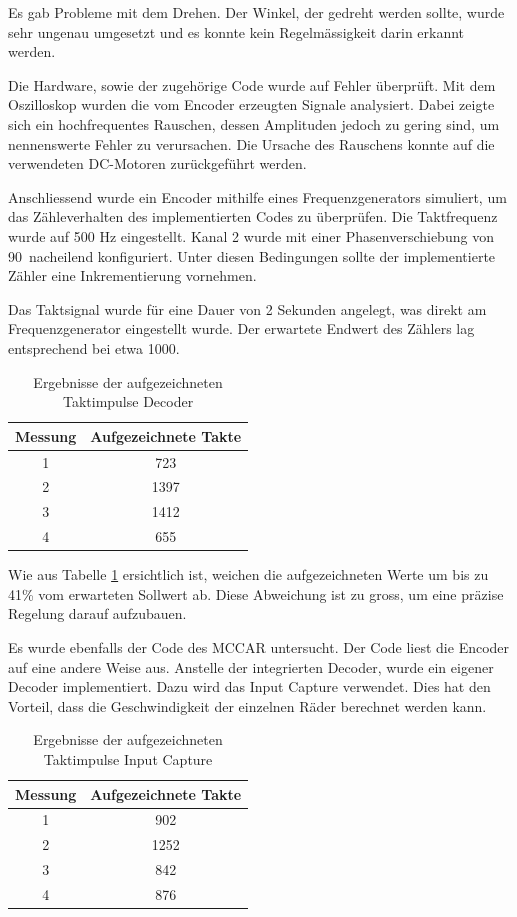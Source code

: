 Es gab Probleme mit dem Drehen. Der Winkel, der gedreht werden sollte, wurde sehr ungenau umgesetzt und es konnte kein Regelmässigkeit darin erkannt werden.

Die Hardware, sowie der zugehörige Code wurde auf Fehler überprüft. Mit dem Oszilloskop wurden die vom Encoder erzeugten Signale analysiert. Dabei zeigte sich ein hochfrequentes Rauschen, dessen Amplituden jedoch zu gering sind, um nennenswerte Fehler zu verursachen. Die Ursache des Rauschens konnte auf die verwendeten DC-Motoren zurückgeführt werden.

Anschliessend wurde ein Encoder mithilfe eines Frequenzgenerators simuliert, um das Zähleverhalten des implementierten Codes zu überprüfen. Die Taktfrequenz wurde auf 500 Hz eingestellt. Kanal 2 wurde mit einer Phasenverschiebung von 90\textdegree \ nacheilend konfiguriert. Unter diesen Bedingungen sollte der implementierte Zähler eine Inkrementierung vornehmen.

Das Taktsignal wurde für eine Dauer von 2 Sekunden angelegt, was direkt am Frequenzgenerator eingestellt wurde. Der erwartete Endwert des Zählers lag entsprechend bei etwa 1000.

\begin{table}[H]
\centering
\caption{Ergebnisse der aufgezeichneten Taktimpulse Decoder}
\label{tab:taktergebnisse_de}
\begin{tabular}{|c|c|}
\hline
\textbf{Messung} & \textbf{Aufgezeichnete Takte} \\
\hline
1 & 723 \\
2 & 1397 \\
3 & 1412 \\
4 & 655 \\
\hline
\end{tabular}
\end{table}

Wie aus Tabelle \ref{tab:taktergebnisse_de} ersichtlich ist, weichen die aufgezeichneten Werte um bis zu 41\% vom erwarteten Sollwert ab. Diese Abweichung ist zu gross, um eine präzise Regelung darauf aufzubauen.

Es wurde ebenfalls der Code des MCCAR untersucht. Der Code liest die Encoder auf eine andere Weise aus. Anstelle der integrierten Decoder, wurde ein eigener Decoder implementiert. Dazu wird das Input Capture verwendet. Dies hat den Vorteil, dass die Geschwindigkeit der einzelnen Räder berechnet werden kann.

\begin{table}[H]
\centering
\caption{Ergebnisse der aufgezeichneten Taktimpulse Input Capture}
\label{tab:taktergebnisse_im}
\begin{tabular}{|c|c|}
\hline
\textbf{Messung} & \textbf{Aufgezeichnete Takte} \\
\hline
1 & 902 \\
2 & 1252 \\
3 & 842 \\
4 & 876 \\
\hline
\end{tabular}
\end{table}

